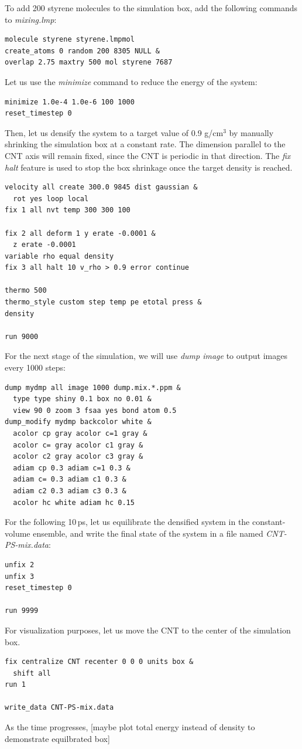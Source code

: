 \documentclass[9pt,tutorial]{livecoms}
\begin{document}
To add 200 styrene molecules to the simulation box, add the following commands
to \textit{mixing.lmp}:
{\normalsize
\begin{verbatim}
molecule styrene styrene.lmpmol
create_atoms 0 random 200 8305 NULL &
overlap 2.75 maxtry 500 mol styrene 7687
\end{verbatim}
}
Let us use the \textit{minimize} command to reduce the energy of the system:
{\normalsize
\begin{verbatim}
minimize 1.0e-4 1.0e-6 100 1000
reset_timestep 0
\end{verbatim}
}
Then, let us densify the system to a target value of 0.9 g/cm$^3$
by manually shrinking the simulation box at a constant rate.  The dimension parallel
to the CNT axis will remain fixed, since the CNT is periodic in that direction.
The \textit{fix halt} feature is used to stop the box shrinkage once the target density is
reached.
{\normalsize
\begin{verbatim}
velocity all create 300.0 9845 dist gaussian &
  rot yes loop local
fix 1 all nvt temp 300 300 100

fix 2 all deform 1 y erate -0.0001 &
  z erate -0.0001
variable rho equal density
fix 3 all halt 10 v_rho > 0.9 error continue

thermo 500
thermo_style custom step temp pe etotal press &
density

run 9000
\end{verbatim}
}
For the next stage of the simulation, we will use \textit{dump image} to
output images every 1000 steps:
{\normalsize
\begin{verbatim}
dump mydmp all image 1000 dump.mix.*.ppm &
  type type shiny 0.1 box no 0.01 &
  view 90 0 zoom 3 fsaa yes bond atom 0.5
dump_modify mydmp backcolor white &
  acolor cp gray acolor c=1 gray &
  acolor c= gray acolor c1 gray &
  acolor c2 gray acolor c3 gray &
  adiam cp 0.3 adiam c=1 0.3 &
  adiam c= 0.3 adiam c1 0.3 &
  adiam c2 0.3 adiam c3 0.3 &
  acolor hc white adiam hc 0.15
\end{verbatim}
}
For the following 10\,ps, let us equilibrate the densified system
in the constant-volume ensemble, and write the final state of the
system in a file named \textit{CNT-PS-mix.data}:
{\normalsize
\begin{verbatim}
unfix 2
unfix 3
reset_timestep 0

run 9999
\end{verbatim}
}
For visualization purposes, let us move the CNT to the center of the simulation box.
{\normalsize
\begin{verbatim}
fix centralize CNT recenter 0 0 0 units box &
  shift all
run 1

write_data CNT-PS-mix.data
\end{verbatim}
}
As the time progresses, [maybe plot total energy instead of density
to demonstrate equilbrated box]
\end{document}
